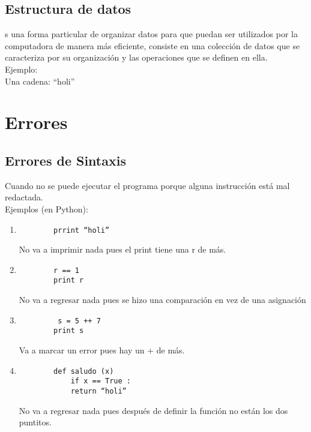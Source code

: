 \documentclass{book} %
\begin{document}
\section{Estructura de datos }
s una forma particular de organizar datos para que puedan ser utilizados por la computadora de manera más eficiente, consiste en una colección de datos que se caracteriza por su organización y las operaciones que se definen en ella. \\
Ejemplo: \\
Una cadena: “holi”

\chapter{Errores}
\section{Errores de Sintaxis}
Cuando no se puede ejecutar el programa porque alguna instrucción está mal redactada.\\Ejemplos (en Python):
\begin{enumerate}
	\item \begin{verbatim}
		prrint “holi”
	\end{verbatim}
	No va a imprimir nada pues el print tiene una r de más.
	\item \begin{verbatim}
		r == 1
		print r
	\end{verbatim}
	No va a regresar nada pues se hizo una comparación en vez de una asignación
	\item \begin{verbatim}
		 s = 5 ++ 7
		print s
	\end{verbatim} Va a marcar un error pues hay un + de más. 
	\item \begin{verbatim}
		def saludo (x)
			if x == True :
			return “holi” 
	\end{verbatim}
	No va a regresar nada pues después de definir la función no están los dos puntitos.
\end{enumerate}
\end{document}

